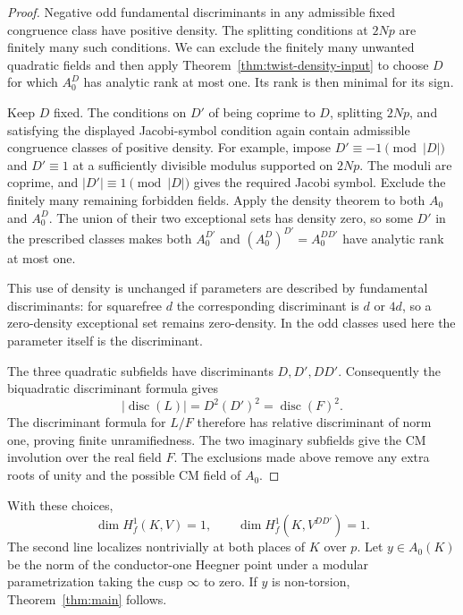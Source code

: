 \begin{proof}
Negative odd fundamental discriminants in any admissible fixed
congruence class have positive density. The splitting conditions at
$2Np$ are finitely many such conditions. We can exclude the finitely
many unwanted quadratic fields and then apply
Theorem~\ref{thm:twist-density-input} to choose $D$ for which $A_0^D$
has analytic rank at most one. Its rank is then minimal for its sign.

Keep $D$ fixed. The conditions on $D'$ of being coprime to $D$,
splitting $2Np$, and satisfying the displayed Jacobi-symbol condition
again contain admissible congruence classes of positive density. For
example, impose $D'\equiv-1\pmod{|D|}$ and $D'\equiv1$ at a
sufficiently divisible modulus supported on $2Np$. The moduli are
coprime, and $|D'|\equiv1\pmod{|D|}$ gives the required Jacobi
symbol. Exclude the finitely many remaining forbidden fields. Apply
the density theorem to both $A_0$ and $A_0^D$. The union of their two
exceptional sets has density zero, so some $D'$ in the prescribed
classes makes both $A_0^{D'}$ and $(A_0^D)^{D'}=A_0^{DD'}$ have
analytic rank at most one.

This use of density is unchanged if parameters are described by
fundamental discriminants: for squarefree $d$ the corresponding
discriminant is $d$ or $4d$, so a zero-density exceptional set remains
zero-density. In the odd classes used here the parameter itself is
the discriminant.

The three quadratic subfields have discriminants $D,D',DD'$.
Consequently the biquadratic discriminant formula gives
\[
 |\operatorname{disc}(L)|=D^2(D')^2
   =\operatorname{disc}(F)^2.
\]
The discriminant formula for $L/F$ therefore has relative
discriminant of norm one, proving finite unramifiedness. The two
imaginary subfields give the CM involution over the real field $F$.
The exclusions made above remove any extra roots of unity and the
possible CM field of $A_0$.
\end{proof}

\begin{proposition}\label{prop:arithmetic-reduction}
With these choices,
\[
 \dim H^1_f(K,V)=1,
 \qquad
 \dim H^1_f(K,V^{DD'})=1.
\]
The second line localizes nontrivially at both places of $K$ over $p$.
Let $y\in A_0(K)$ be the norm of the conductor-one Heegner point
under a modular parametrization taking the cusp $\infty$ to zero.
If $y$ is non-torsion, Theorem~\ref{thm:main} follows.
\end{proposition}

